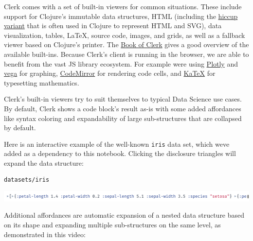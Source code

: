 \documentclass[sigconf,screen]{acmart}
\newcommand{\passthrough}[1]{#1}
\begin{document}
Clerk comes with a set of built-in viewers for common situations. These include support for Clojure's immutable data structures, HTML (including the \href{https://github.com/weavejester/hiccup}{hiccup variant} that is often used in Clojure to represent HTML and SVG), data visualization, tables, LaTeX, source code, images, and grids, as well as a fallback viewer based on Clojure's printer. The \href{https://book.clerk.vision}{Book of Clerk} gives a good overview of the available built-ins. Because Clerk's client is running in the browser, we are able to benefit from the vast JS library ecosystem. For example we\textquotesingle re using \href{https://plotly.com/javascript/}{Plotly} and \href{https://github.com/vega/vega-embed}{vega} for graphing, \href{https://codemirror.net}{CodeMirror} for rendering code cells, and \href{https://katex.org}{KaTeX} for typesetting mathematics.

Clerk's built-in viewers try to suit themselves to typical Data Science use cases. By default, Clerk shows a code block's result as-is with some added affordances like syntax coloring and expandability of large sub-structures that are collapsed by default.

Here is an interactive example of the well-known \passthrough{\lstinline!iris!} data set, which we\textquotesingle ve added as a dependency to this notebook. Clicking the disclosure triangles will expand the data structure:

\begin{minipage}{\linewidth}
\begin{lstlisting}
datasets/iris
\end{lstlisting}
\end{minipage}

\includegraphics{images/anon-expr-5dtc44qrw3zUvpTfiAXJDH7mtADdRT-result.png}

Additional affordances are automatic expansion of a nested data structure based on its shape and expanding multiple sub-structures on the same level, as demonstrated in this video:
\end{document}
